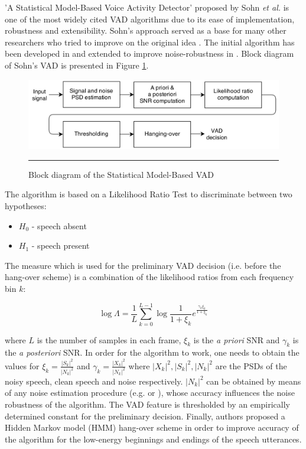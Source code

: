 'A Statistical Model-Based Voice Activity Detector' proposed by Sohn \emph{et al.} \cite{Sohn} is one of the most widely cited VAD algorithms due to its ease of implementation, robustness and extensibility. Sohn's approach served as a base for many other researchers who tried to improve on the original idea \cite{ImprovedLikelihood, Tan, Cho}. The initial algorithm has been developed in \cite{SohnInitial} and extended to improve noise-robustness in \citep{Sohn}. Block diagram of Sohn's VAD is presented in Figure \ref{fig:Sohn}.

\begin{figure}[htbp]
	\centering
		\includegraphics[width=0.9\columnwidth]{Figures/Sohn.png}
		\rule{37em}{0.5pt}
	\caption[Block diagram of the Statistical Model-Based VAD]{Block diagram of the Statistical Model-Based VAD \cite{Sohn}}
	\label{fig:Sohn}
\end{figure}

The algorithm is based on a Likelihood Ratio Test to discriminate between two hypotheses:
\begin{itemize}
\item[] $H_0$ - speech absent
\item[] $H_1$ - speech present
\end{itemize}

The measure which is used for the preliminary VAD decision (i.e. before the hang-over scheme) is a combination of the likelihood ratios from each frequency bin $k$:

\begin{equation}
\log \Lambda = \frac{1}{L} \sum_{k=0}^{L-1} \log \frac{1}{1+\xi_k} e^{\frac{\gamma_k\xi_k}{1+\xi_k}}
\end{equation}

where $L$ is the number of samples in each frame, $\xi_k$ is the \emph{a priori} SNR and $\gamma_k$ is the \emph{a posteriori} SNR. In order for the algorithm to work, one needs to obtain the values for $\xi_k = \frac{\left | S_k \right |^{2}}{\left | N_k \right |^{2}}$ and $\gamma_k = \frac{\left | X_k \right |^{2}}{\left | N_k \right |^{2}}$ where $\left | X_k \right |^{2}, \left | S_k \right |^{2}, \left | N_k \right |^{2}$ are the PSDs of the noisy speech, clean speech and noise respectively. $\left | N_k \right |^{2}$ can be obtained by means of any noise estimation procedure (e.g. \cite{MSnoise} or \cite{MMSEnoise}), whose accuracy influences the noise robustness of the algorithm. The VAD feature is thresholded by an empirically determined constant for the preliminary decision. Finally, authors proposed a Hidden Markov model (HMM) hang-over scheme in order to improve accuracy of the algorithm for the low-energy beginnings and endings of the speech utterances.

